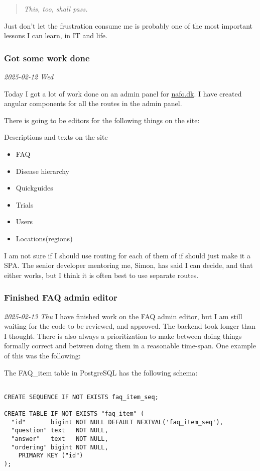 \documentclass[../main.tex]{subfiles}
\begin{document}
\begin{quote}
\emph{This, too, shall pass.}
\end{quote}

Just don't let the frustration consume me is probably one of the most important lessons I can learn, in IT and life.

\subsubsection{Got some work done}

\noindent \textit{2025-02-12 Wed}

Today I got a lot of work done on an admin panel for \href{https://www.nationaltforsoegsoverblik.dk/}{nafo.dk}. I have created angular components for all the routes in the admin panel.

There is going to be editors for the following things on the site:

Descriptions and texts on the site

\begin{itemize}
\item FAQ
\item Disease hierarchy
\item Quickguides
\item Trials
\item Users
\item Locations(regions)
\end{itemize}

I am not sure if I should use routing for each of them of if should just make it a SPA. The senior developer mentoring me, Simon, has said I can decide, and that either works, but I think it is often best to use separate routes.

\subsubsection{Finished FAQ admin editor}

\noindent \textit{2025-02-13 Thu} I have finished work on the FAQ admin editor, but I am still waiting for the code to be reviewed, and approved. The backend took longer than I thought. There is also always a prioritization to make between doing things formally correct and between doing them in a reasonable time-span. One example of this was the following:

The FAQ\_item table in PostgreSQL has the following schema:

\begin{verbatim}
    
CREATE SEQUENCE IF NOT EXISTS faq_item_seq;
  
CREATE TABLE IF NOT EXISTS "faq_item" ( 
  "id"       bigint NOT NULL DEFAULT NEXTVAL('faq_item_seq'),
  "question" text   NOT NULL,
  "answer"   text   NOT NULL,
  "ordering" bigint NOT NULL,
    PRIMARY KEY ("id")
);

\end{verbatim}
\end{document}
